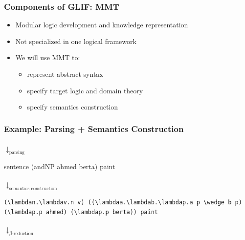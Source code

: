 \begin{frame}[fragile]
    \frametitle{Components of GLIF: MMT}
    \lstset{frame=single}
    \begin{itemize}   
        \item Modular logic development and knowledge representation
        \item Not specialized in one logical framework 
        \item We will use MMT to:
        \begin{itemize}
            \item {  represent abstract syntax }
            \item {  specify target logic and domain theory}
            \item {  specify semantics construction}
        \end{itemize}
    \end{itemize}
    \lstset{basicstyle=\footnotesize\ttfamily}
    
    \vspace{1em}
    \begin{minipage}[t][4cm]{\textwidth}
        \centering
    \end{minipage}
\end{frame}

\begin{frame}[fragile]
    \frametitle{Example: Parsing + Semantics Construction}
    {\centering{}\par}\vspace{1em}
    \hspace{0.49\textwidth}$\downarrow_{\text{parsing}}$\par\vspace{1em}
    {\centering\color{logicfont!50!nlfont} sentence (andNP ahmed berta) paint\par}\vspace{1em}
    \hspace{0.49\textwidth}$\downarrow_{\text{semantics construction}}$\par\vspace{1em}
    {\color{logicfont}\footnotesize\lstinline[language=MMT]|(\lambdan.\lambdav.n v) ((\lambdaa.\lambdab.\lambdap.a p \wedge b p) (\lambdap.p ahmed) (\lambdap.p berta)) paint|}\par\vspace{1em}
    \hspace{0.49\textwidth}$\downarrow_{\text{$\beta$-reduction}}$\par\vspace{1em}
\end{frame}

